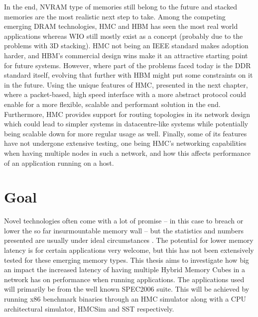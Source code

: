 In the end, NVRAM type of memories still belong to the future and stacked memories are the most realistic next step to take. Among the competing emerging DRAM technologies, HMC and HBM has seen the most real world applications whereas WIO still mostly exist as a concept (probably due to the problems with 3D stacking). HMC not being an IEEE standard makes adoption harder, and HBM's commercial design wins make it an attractive starting point for future systems. However, where part of the problems faced today is the DDR standard itself, evolving that further with HBM might put some constraints on it in the future. Using the unique features of HMC, presented in the next chapter, where a packet-based, high speed interface with a more abstract protocol could enable for a more flexible, scalable and performant solution in the end. Furthermore, HMC provides support for routing topologies in its network design which could lead to simpler systems in datacentre-like systems while potentially being scalable down for more regular usage as  well. Finally, some of its features have not undergone extensive testing, one being HMC's networking capabilities when having multiple nodes in such a network, and how this affects performance of an application running on a host.


\section{Goal}
Novel technologies often come with a lot of promise -- in this case to breach or lower the so far insurmountable memory wall -- but the statistics and numbers presented are usually under ideal circumstances \cite{Radulovic:2015:TWM:2818950.2818955}. The potential for lower memory latency is for certain applications very welcome, but this has not been extensively tested for these emerging memory types. This thesis aims to investigate how big an impact the increased latency of having multiple Hybrid Memory Cubes in a network has on performance when running applications. The applications used will primarily be from the well known SPEC2006 suite. This will be achieved by running x86 benchmark binaries through an HMC simulator along with a CPU architectural simulator, HMCSim and SST respectively. 

